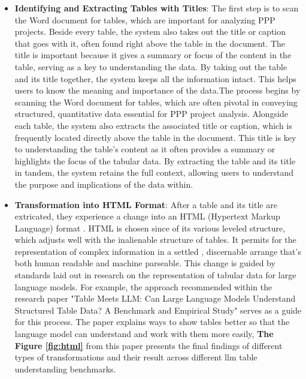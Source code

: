 \begin{itemize}
\item \textbf{Identifying and Extracting Tables with Titles}: The first step is to scan the Word document for tables, which are important for analyzing PPP projects. Beside every table, the system also takes out the title or caption that goes with it, often found right above the table in the document. The title is important because it gives a summary or focus of the content in the table, serving as a key to understanding the data. By taking out the table and its title together, the system keeps all the information intact. This helps users to know the meaning and importance of the data.The process begins by scanning the Word document for tables, which are often pivotal in conveying structured, quantitative data essential for PPP project analysis. Alongside each table, the system also extracts the associated title or caption, which is frequently located directly above the table in the document. This title is key to understanding the table's content as it often provides a summary or highlights the focus of the tabular data. By extracting the table and its title in tandem, the system retains the full context, allowing users to understand the purpose and implications of the data within.
\vskip 0.5cm
\item \textbf{Transformation into HTML Format}: After a table and its title are extricated, they experience a change into an HTML (Hypertext Markup Language) format . HTML is chosen since of its various leveled structure, which adjusts well with the inalienable structure of tables. It permits for the representation of complex information in a settled , discernable arrange that's both human readable and machine parseable.
\vskip 0.5cm
This change is guided by standards laid out in research on the representation of tabular data for large language models. For example, the approach recommended within the research paper "Table Meets LLM: Can Large Language Models Understand Structured Table Data? A Benchmark and Empirical Study" \cite{w14} serves as a guide for this process. The paper explains ways to show tables better so that the language model can understand and work with them more easily, \textbf{The Figure \ref{fig:html}} from this paper presents the final findings of different types of transformations and their result across different llm table understanding benchmarks.

\end{itemize}
